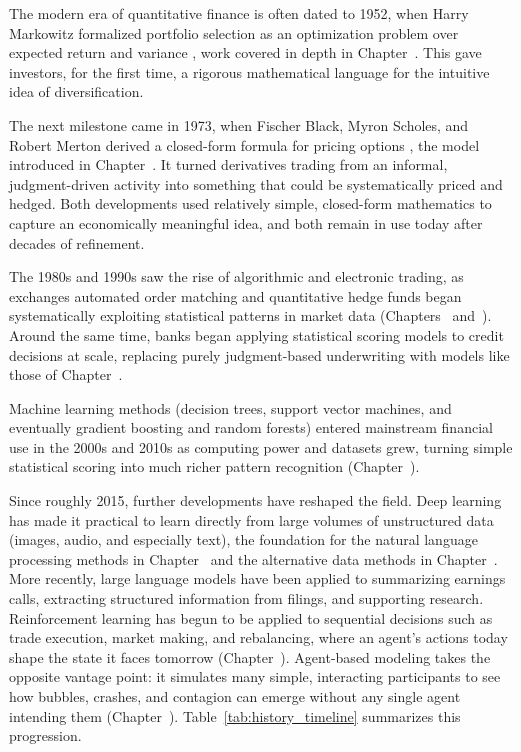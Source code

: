 \documentclass[../ai_in_finance]{subfiles}
\begin{document}
The modern era of quantitative finance is often dated to 1952, when Harry Markowitz formalized portfolio selection as an optimization problem over expected return and variance \parencite{markowitz1952portfolio}, work covered in depth in Chapter~. This gave investors, for the first time, a rigorous mathematical language for the intuitive idea of diversification.

The next milestone came in 1973, when Fischer Black, Myron Scholes, and Robert Merton derived a closed-form formula for pricing options \parencite{black1973pricing,merton1973theory}, the model introduced in Chapter~. It turned derivatives trading from an informal, judgment-driven activity into something that could be systematically priced and hedged. Both developments used relatively simple, closed-form mathematics to capture an economically meaningful idea, and both remain in use today after decades of refinement.

The 1980s and 1990s saw the rise of algorithmic and electronic trading, as exchanges automated order matching and quantitative hedge funds began systematically exploiting statistical patterns in market data (Chapters~ and~). Around the same time, banks began applying statistical scoring models to credit decisions at scale, replacing purely judgment-based underwriting with models like those of Chapter~.

Machine learning methods (decision trees, support vector machines, and eventually gradient boosting and random forests) entered mainstream financial use in the 2000s and 2010s as computing power and datasets grew, turning simple statistical scoring into much richer pattern recognition (Chapter~).

Since roughly 2015, further developments have reshaped the field. Deep learning has made it practical to learn directly from large volumes of unstructured data (images, audio, and especially text), the foundation for the natural language processing methods in Chapter~ and the alternative data methods in Chapter~. More recently, large language models have been applied to summarizing earnings calls, extracting structured information from filings, and supporting research. Reinforcement learning has begun to be applied to sequential decisions such as trade execution, market making, and rebalancing, where an agent's actions today shape the state it faces tomorrow (Chapter~). Agent-based modeling takes the opposite vantage point: it simulates many simple, interacting participants to see how bubbles, crashes, and contagion can emerge without any single agent intending them (Chapter~). Table~\ref{tab:history_timeline} summarizes this progression.
\end{document}
